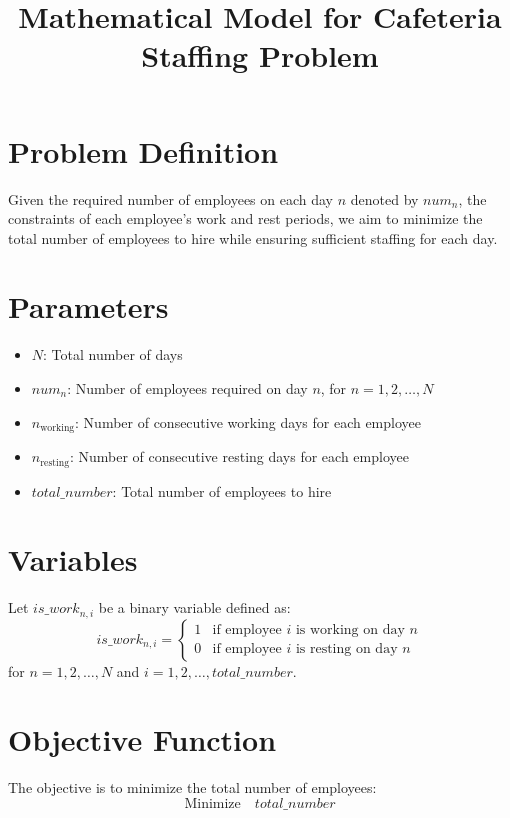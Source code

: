 \documentclass{article}
\begin{document}
\title{Mathematical Model for Cafeteria Staffing Problem}
\author{}
\date{}
\maketitle

\section*{Problem Definition}

Given the required number of employees on each day \( n \) denoted by \( num_n \), the constraints of each employee's work and rest periods, we aim to minimize the total number of employees to hire while ensuring sufficient staffing for each day.

\section*{Parameters}
\begin{itemize}
    \item \( N \): Total number of days
    \item \( num_n \): Number of employees required on day \( n \), for \( n = 1, 2, \ldots, N \)
    \item \( n_{\text{working}} \): Number of consecutive working days for each employee
    \item \( n_{\text{resting}} \): Number of consecutive resting days for each employee
    \item \( total\_number \): Total number of employees to hire
\end{itemize}

\section*{Variables}
Let \( is\_work_{n,i} \) be a binary variable defined as:
\[
is\_work_{n,i} = 
\begin{cases} 
1 & \text{if employee } i \text{ is working on day } n \\
0 & \text{if employee } i \text{ is resting on day } n 
\end{cases}
\]
for \( n = 1, 2, \ldots, N \) and \( i = 1, 2, \ldots, total\_number \).

\section*{Objective Function}
The objective is to minimize the total number of employees:
\[
\text{Minimize} \quad total\_number
\]
\end{document}
